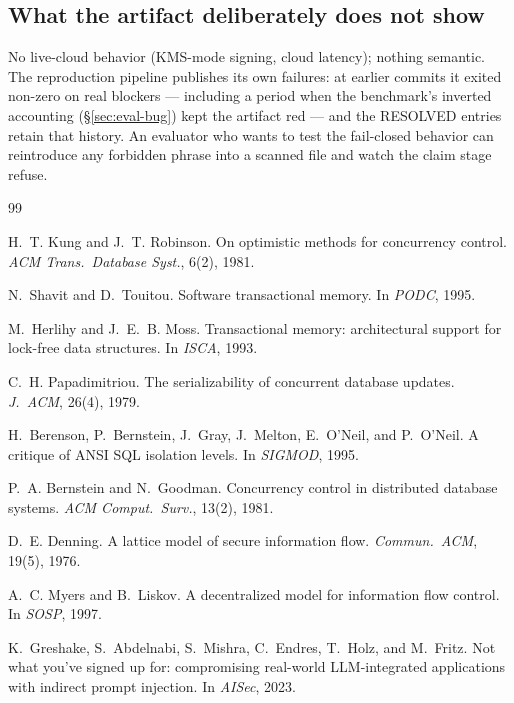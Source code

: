 \documentclass[10pt,twocolumn,letterpaper]{article}
\begin{document}
\subsection{What the artifact deliberately does not show}
No live-cloud behavior (KMS-mode signing, cloud latency); nothing semantic.
The reproduction pipeline
publishes its own failures: at earlier commits it exited non-zero on real
blockers --- including a period when the benchmark's inverted accounting
(\S\ref{sec:eval-bug}) kept the artifact red --- and the RESOLVED entries
retain that history. An evaluator who wants to test the fail-closed behavior
can reintroduce any forbidden phrase into a scanned file and watch the claim
stage refuse.

\begin{thebibliography}{99}\small

H.~T. Kung and J.~T. Robinson.
On optimistic methods for concurrency control.
\emph{ACM Trans.\ Database Syst.}, 6(2), 1981.

N.~Shavit and D.~Touitou.
Software transactional memory.
In \emph{PODC}, 1995.

M.~Herlihy and J.~E.~B. Moss.
Transactional memory: architectural support for lock-free data structures.
In \emph{ISCA}, 1993.

C.~H. Papadimitriou.
The serializability of concurrent database updates.
\emph{J.~ACM}, 26(4), 1979.

H.~Berenson, P.~Bernstein, J.~Gray, J.~Melton, E.~O'Neil, and P.~O'Neil.
A critique of ANSI SQL isolation levels.
In \emph{SIGMOD}, 1995.

P.~A. Bernstein and N.~Goodman.
Concurrency control in distributed database systems.
\emph{ACM Comput.\ Surv.}, 13(2), 1981.

D.~E. Denning.
A lattice model of secure information flow.
\emph{Commun.\ ACM}, 19(5), 1976.

A.~C. Myers and B.~Liskov.
A decentralized model for information flow control.
In \emph{SOSP}, 1997.

K.~Greshake, S.~Abdelnabi, S.~Mishra, C.~Endres, T.~Holz, and M.~Fritz.
Not what you've signed up for: compromising real-world LLM-integrated
applications with indirect prompt injection.
In \emph{AISec}, 2023.


\end{thebibliography}
\end{document}

